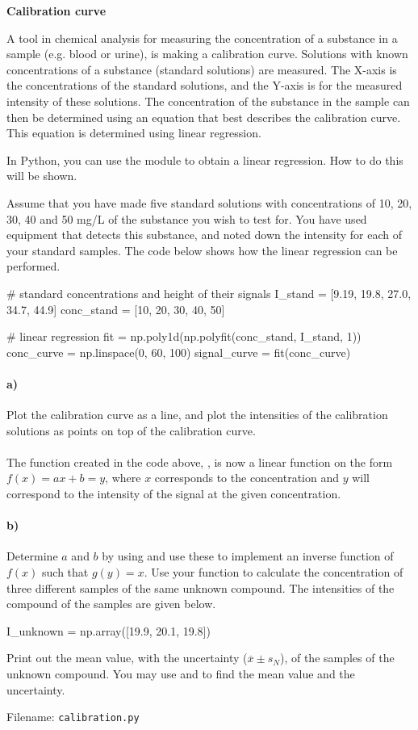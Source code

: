 \begin{Problem}{\textbf{Calibration curve}}

\noindent
A tool in chemical analysis for measuring the concentration of a substance in a sample (e.g. blood or urine), is making a calibration curve. Solutions with known concentrations of a substance (standard solutions) are measured. The X-axis is the concentrations of the standard solutions, and the Y-axis is for the measured intensity of these solutions. The concentration of the substance in the sample can then be determined using an equation that best describes the calibration curve. This equation is determined using linear regression.

In Python, you can use the  module to obtain a linear regression. How to do this will be shown.

Assume that you have made five standard solutions with concentrations of 10, 20, 30, 40 and 50 mg/L of the substance you wish to test for. You have used equipment that detects this substance, and noted down the intensity for each of your standard samples. The code below shows how the linear regression can be performed.
\begin{python}
# standard concentrations and height of their signals
I_stand = [9.19, 19.8, 27.0, 34.7, 44.9]
conc_stand = [10, 20, 30, 40, 50]

# linear regression
fit = np.poly1d(np.polyfit(conc_stand, I_stand, 1))
conc_curve = np.linspace(0, 60, 100)
signal_curve = fit(conc_curve)
\end{python}

\paragraph{a)}
Plot the calibration curve as a line, and plot the intensities of the calibration solutions as points on top of the calibration curve.

\paragraph{}
\noindent
The function created in the code above, , is now a linear function on the form $f(x) = a x + b = y$, where $x$ corresponds to the concentration and $y$ will correspond to the intensity of the signal at the given concentration.

\paragraph{b)}
Determine $a$ and $b$ by using  and use these to implement an inverse function of $f(x)$ such that $g(y) = x$. Use your function to calculate the concentration of three different samples of the same unknown compound. The intensities of the compound of the samples are given below.
\begin{python}
I_unknown = np.array([19.9, 20.1, 19.8])
\end{python}
Print out the mean value, with the uncertainty ($\overline{x} \pm s_N$), of the samples of the unknown compound. You may use  and  to find the mean value and the uncertainty.

Filename: \texttt{calibration.py}
\end{Problem}
